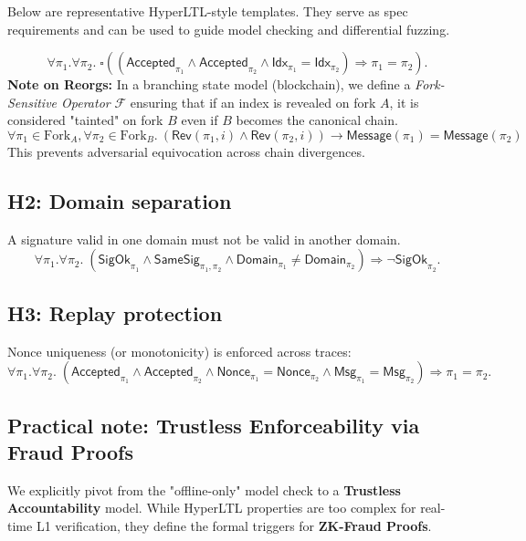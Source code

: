 \documentclass[conference]{IEEEtran}
\theoremstyle{definition}
\theoremstyle{plain}
\theoremstyle{remark}
\begin{document}
Below are representative HyperLTL-style templates. They serve as spec requirements and can be used to guide model checking and differential fuzzing.

\[
\forall \pi_1.\forall \pi_2.\;
\square ((\textsf{Accepted}_{\pi_1} \wedge \textsf{Accepted}_{\pi_2} \wedge
\textsf{Idx}_{\pi_1} = \textsf{Idx}_{\pi_2}) \Rightarrow \pi_1 = \pi_2).
\]
\textbf{Note on Reorgs:} In a branching state model (blockchain), we define a \emph{Fork-Sensitive Operator} $\mathcal{F}$ ensuring that if an index is revealed on fork $A$, it is considered "tainted" on fork $B$ even if $B$ becomes the canonical chain.
\[
\forall \pi_1 \in \text{Fork}_A, \forall \pi_2 \in \text{Fork}_B.\ (\textsf{Rev}(\pi_1, i) \wedge \textsf{Rev}(\pi_2, i)) \rightarrow \textsf{Message}(\pi_1) = \textsf{Message}(\pi_2)
\]
This prevents adversarial equivocation across chain divergences.

\subsection*{H2: Domain separation}
A signature valid in one domain must not be valid in another domain.
\[
\forall \pi_1.\forall \pi_2.\;
(\textsf{SigOk}_{\pi_1} \wedge \textsf{SameSig}_{\pi_1,\pi_2} \wedge
\textsf{Domain}_{\pi_1}\neq \textsf{Domain}_{\pi_2}) \Rightarrow \neg \textsf{SigOk}_{\pi_2}.
\]

\subsection*{H3: Replay protection}
Nonce uniqueness (or monotonicity) is enforced across traces:
\[
\forall \pi_1.\forall \pi_2.\;
(\textsf{Accepted}_{\pi_1}\wedge \textsf{Accepted}_{\pi_2}\wedge
\textsf{Nonce}_{\pi_1}=\textsf{Nonce}_{\pi_2}\wedge
\textsf{Msg}_{\pi_1}=\textsf{Msg}_{\pi_2}) \Rightarrow \pi_1=\pi_2.
\]

\subsection*{Practical note: Trustless Enforceability via Fraud Proofs}
We explicitly pivot from the "offline-only" model check to a \textbf{Trustless Accountability} model. While HyperLTL properties are too complex for real-time L1 verification, they define the formal triggers for \textbf{ZK-Fraud Proofs}. 
\end{document}

